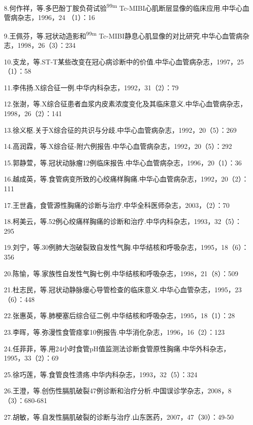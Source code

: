 8.何作祥，等.多巴酚丁胺负荷试验\textsuperscript{99m}
Tc-MIBI心肌断层显像的临床应用.中华心血管病杂志，1996，24 （1）：16

9.王佩芬，等.冠状动造影和\textsuperscript{99m}
Tc-MIBI静息心肌显像的对比研究.中华心血管病杂志，1998，26（3）：234

10.支龙，等.ST-T某些改变在冠心病诊断中的价值.中华心血管病杂志，1997，25（1）：58

11.李伟扬.X综合征一例.中华内科杂志，1992，31（2）：79

12.张澍，等.X综合征患者血浆内皮素浓度变化及其临床意义.中华心血管病杂志，1998，26（2）：141

13.徐义枢.关于X综合征的共识与分歧.中华心血管病杂志，1992，20（5）：269

14.高润霖，等.X综合征-附六例报告.中华心血管病杂志，1992，20（5）：292

15.郭静萱，等.冠状动脉瘤12例临床报告.中华心血管病杂志，1996，20（1）：36

16.越成英，等.食管病变所致的心绞痛样胸痛.中华心血管病杂志，1992，20（2）：111

17.王世鑫，食管源性胸痛的诊断与治疗.中华全科医师杂志，2003，（2）：70

18.柯美云，等.52例心绞痛样胸痛的诊断和治疗.中华内科杂志，1993，32（5）：295

19.刘宁，等.30例肺大泡破裂致自发性气胸.中华结核和呼吸杂志，1995，18（6）：356

20.陈愉，等.家族性自发性气胸七例.中华结核和呼吸杂志，1998，21（8）：509

21.杜志民，等.冠状动静脉瘘心导管检查的临床意义.中华心血管杂志，1995，23（6）：448

22.张惠英，等.肺梗塞后综合征二例.中华结核和呼吸杂志，1995，18（1）：28

23.李晖，等.弥漫性食管痉挛10例报告.中华消化杂志，1996，16（2）：123

24.任菲菲，等.用24小时食管pH值监测法诊断食管原性胸痛.中华外科杂志，1995，33（2）：69

25.徐巧莲，等.食管良性溃疡.中华内科杂志，1993，32（5）：324

26.王澄，等.创伤性膈肌破裂47例诊断和治疗分析.中国误诊学杂志，2008，8（3）：680-681

27.胡敏，等.自发性膈肌破裂的诊断与治疗.山东医药，2007，47（30）：49-50

\protect\hypertarget{text00103.html}{}{}

